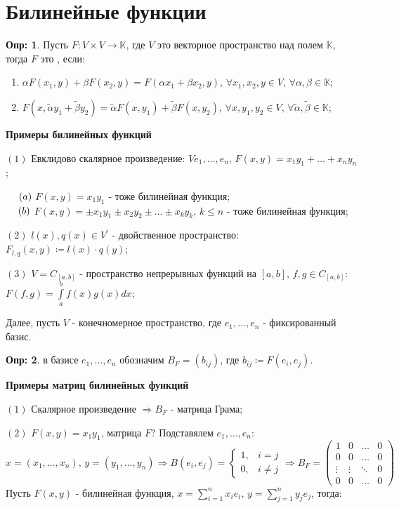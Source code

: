\documentclass[12pt]{article}
\newcommand{\MK}{\mathbb{K}}
\theoremstyle{definition}
\newtheorem{defn}{Опр:}
\newcommand{\wte}[1]{\widetilde{#1}}
\newcommand{\ddint}[2]{\displaystyle\int\limits_{#1}^{#2}}
\begin{document}
\section*{Билинейные функции}
\begin{defn}
	Пусть $F \colon V \times V \to \MK$, где $V$ это векторное пространство над полем $\MK$, тогда $F$ это , если:
	\begin{enumerate}[label ={(\arabic*)}]
		\item $\alpha F(x_1, y) + \beta F(x_2, y) = F(\alpha x_1 + \beta x_2, y), \, \forall x_1, x_2, y \in V, \, \forall \alpha, \beta \in \MK$;
		\item $F(x, \wte{\alpha} y_1 + \wte{\beta} y_2) = \wte{\alpha} F(x,y_1) + \wte{\beta} F(x,y_2), \, \forall x, y_1, y_2 \in V, \, \forall \wte{\alpha}, \wte{\beta} \in \MK$;
	\end{enumerate}
\end{defn}

\textbf{Примеры билинейных функций}

$(1)$ Евклидово скалярное произведение: $Ve_1,\dotsc, e_n, \, F(x,y) = x_1 y_1 + \dotsc + x_n y_n$;

$\hphantom{(1)}(a)$ $F(x,y) = x_1 y_1$ - тоже билинейная функция;\\
$\hphantom{(1)}(b)$ $F(x,y) = \pm x_1 y_1 \pm x_2 y_2 \pm \dotsc \pm x_k y_k, \, k \leq n$ - тоже билинейная функция;

$(2)$ $l(x), q(x) \in V^\prime$ - двойственное пространство: $F_{l,q}(x,y) \coloneqq l(x){\cdot}q(y)$;

$(3)$ $V = C_{[a,b]}$ - пространство непрерывных функций на $[a,b]$, $f,g \in C_{[a,b]}$: $F(f,g) = \ddint{a}{b}f(x)g(x)dx$;

Далее, пусть $V$ - конечномерное пространство, где $e_1, \dotsc, e_n$ - фиксированный базис.

\begin{defn}
	 в базисе $e_1, \dotsc, e_n$ обозначим $B_F = (b_{ij})$, где $b_{ij} \coloneqq F(e_i, e_j)$.
\end{defn}

\textbf{Примеры матриц билинейных функций}

$(1)$ Скалярное произведение $\Rightarrow B_F$ - матрица Грама;

$(2)$ $F(x,y) = x_1 y_1$, матрица $F$? Подставялем $e_1, \dotsc, e_n$:
$$
	x = (x_1,\dotsc, x_n), \, y = (y_1, \dotsc, y_n) \Rightarrow B(e_i, e_j) = \begin{cases}
		1, & i = j \\
		0, & i \neq j
	\end{cases} \Rightarrow
	B_F = 
	\begin{pmatrix}
		1 & 0 & \dotsc & 0 \\
		0 & 0 & \dotsc & 0 \\
		\vdots & \vdots & \ddots & 0 \\
		0 & 0 & \dotsc & 0
	\end{pmatrix}
$$
Пусть $F(x,y)$ - билинейная функция, $x = \displaystyle \sum\limits_{i = 1}^n x_i e_i, \, y = \displaystyle \sum\limits_{j = 1}^n y_j e_j$, тогда:
\end{document}
